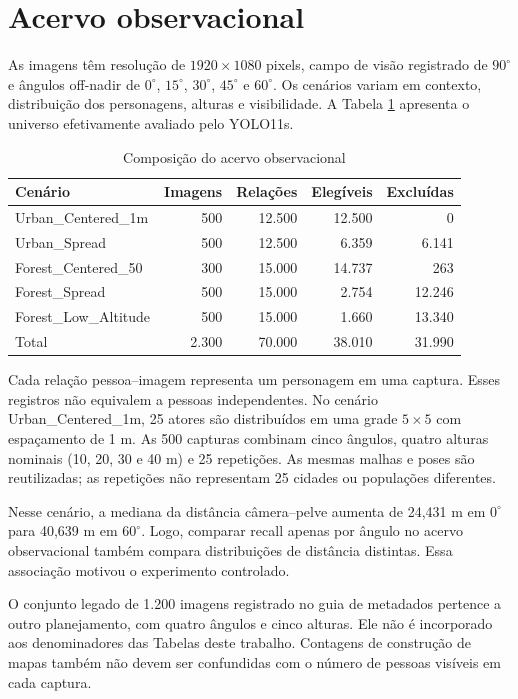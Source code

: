 \section{Acervo observacional}
As imagens têm resolução de $1920\times1080$ pixels, campo de visão registrado de $90^\circ$ e ângulos off-nadir de $0^\circ$, $15^\circ$, $30^\circ$, $45^\circ$ e $60^\circ$. Os cenários variam em contexto, distribuição dos personagens, alturas e visibilidade. A Tabela \ref{tab:acervo} apresenta o universo efetivamente avaliado pelo YOLO11s.
\begin{table}[htb]
\caption{Composição do acervo observacional}
\label{tab:acervo}\centering\small
\begin{tabular}{lrrrr}
\hline Cenário & Imagens & Relações & Elegíveis & Excluídas\\\hline
Urban\_Centered\_1m & 500 & 12.500 & 12.500 & 0\\
Urban\_Spread & 500 & 12.500 & 6.359 & 6.141\\
Forest\_Centered\_50 & 300 & 15.000 & 14.737 & 263\\
Forest\_Spread & 500 & 15.000 & 2.754 & 12.246\\
Forest\_Low\_Altitude & 500 & 15.000 & 1.660 & 13.340\\\hline
Total & 2.300 & 70.000 & 38.010 & 31.990\\\hline
\end{tabular}
\end{table}

Cada relação pessoa--imagem representa um personagem em uma captura. Esses registros não equivalem a pessoas independentes. No cenário Urban\_Centered\_1m, 25 atores são distribuídos em uma grade $5\times5$ com espaçamento de 1 m. As 500 capturas combinam cinco ângulos, quatro alturas nominais (10, 20, 30 e 40 m) e 25 repetições. As mesmas malhas e poses são reutilizadas; as repetições não representam 25 cidades ou populações diferentes.

Nesse cenário, a mediana da distância câmera--pelve aumenta de 24,431 m em $0^\circ$ para 40,639 m em $60^\circ$. Logo, comparar recall apenas por ângulo no acervo observacional também compara distribuições de distância distintas. Essa associação motivou o experimento controlado.

O conjunto legado de 1.200 imagens registrado no guia de metadados pertence a outro planejamento, com quatro ângulos e cinco alturas. Ele não é incorporado aos denominadores das Tabelas deste trabalho. Contagens de construção de mapas também não devem ser confundidas com o número de pessoas visíveis em cada captura.

